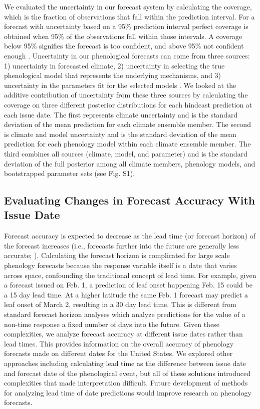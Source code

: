 \documentclass[fleqn,10pt,lineno]{wlpeerj}
\begin{document}
We evaluated the uncertainty in our forecast system by calculating the coverage, which is the fraction of observations that fall within the prediction interval. For a forecast with uncertainty based on a 95\% prediction interval perfect coverage is obtained when 95\% of the observations fall within those intervals. A coverage below 95\% signifies the forecast is too confident, and above 95\% not confident enough \citep{harris2018}. Uncertainty in our phenological forecasts can come from three sources: 1) uncertainty in forecasted climate, 2) uncertainty in selecting the true phenological model that represents the underlying mechanisms, and 3) uncertainty in the parameters fit for the selected models \citep{dietze2017}. We looked at the additive contribution of uncertainty from these three sources by calculating the coverage on three different posterior distributions for each hindcast prediction at each issue date. The first represents climate uncertainty and is the standard deviation of the mean prediction for each climate ensemble member. The second is climate and model uncertainty and is the standard deviation of the mean prediction for each phenology model within each climate ensemble member. The third combines all sources (climate, model, and parameter) and is the standard deviation of the full posterior among all climate members, phenology models, and bootstrapped parameter sets (see Fig. S1).

\subsection*{Evaluating Changes in Forecast Accuracy With Issue Date}

Forecast accuracy is expected to decrease as the lead time (or forecast horizon) of the forecast increases (i.e., forecasts further into the future are generally less accurate; \cite{petchey2015}). Calculating the forecast horizon is complicated for large scale phenology forecasts because the response variable itself is a date that varies across space, confounding the traditional concept of lead time. For example, given a forecast issued on Feb. 1, a prediction of leaf onset happening Feb. 15 could be a 15 day lead time. At a higher latitude the same Feb. 1 forecast may predict a leaf onset of March 2, resulting in a 30 day lead time. This is different from standard forecast horizon analyses which analyze predictions for the value of a non-time response a fixed number of days into the future. Given these complexities, we analyze forecast accuracy at different issue dates rather than lead times. This provides information on the overall accuracy of phenology forecasts made on different dates for the United States. We explored other approaches including calculating lead time as the difference between issue date and forecast date of the phenological event, but all of these solutions introduced complexities that made interpretation difficult. Future development of methods for analyzing lead time of date predictions would improve research on phenology forecasts.
\end{document}
